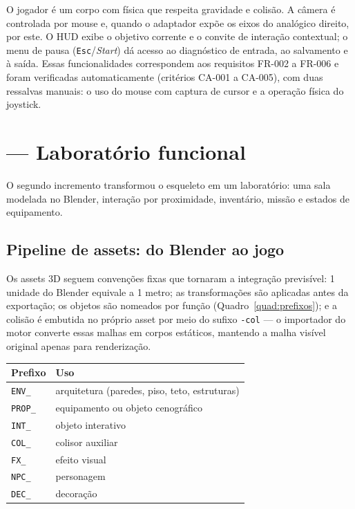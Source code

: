 O jogador é um corpo com física que respeita gravidade e colisão. A câmera é
controlada por mouse e, quando o adaptador expõe os eixos do analógico
direito, por este. O HUD exibe o objetivo corrente e o convite de interação
contextual; o menu de pausa (\texttt{Esc}/\emph{Start}) dá acesso ao
diagnóstico de entrada, ao salvamento e à saída. Essas funcionalidades
correspondem aos requisitos FR-002 a FR-006 e foram verificadas
automaticamente (critérios CA-001 a CA-005), com duas ressalvas manuais: o
uso do mouse com captura de cursor e a operação física do joystick.

\section{ --- Laboratório funcional}
\label{sec:poc2}

O segundo incremento transformou o esqueleto em um laboratório: uma sala
modelada no Blender, interação por proximidade, inventário, missão e estados
de equipamento.

\subsection{Pipeline de assets: do Blender ao jogo}
\label{sec:pipeline_assets}

Os assets 3D seguem convenções fixas que tornaram a integração previsível:
1 unidade do Blender equivale a 1 metro; as transformações são aplicadas antes
da exportação; os objetos são nomeados por função (Quadro~\ref{quad:prefixos});
e a colisão é embutida no próprio asset por meio do sufixo \texttt{-col} ---
o importador do motor converte essas malhas em corpos estáticos, mantendo a
malha visível original apenas para renderização.

\begin{quadro}[htbp]
\centering
\caption{Prefixos de nomenclatura adotados na modelagem.}
\label{quad:prefixos}
\footnotesize
\begin{tabular}{@{}>{\raggedright\arraybackslash}p{2.0cm} >{\raggedright\arraybackslash}p{11.0cm}@{}}
\toprule
Prefixo & Uso \\
\midrule
\texttt{ENV\_} & arquitetura (paredes, piso, teto, estruturas) \\
\texttt{PROP\_} & equipamento ou objeto cenográfico \\
\texttt{INT\_} & objeto interativo \\
\texttt{COL\_} & colisor auxiliar \\
\texttt{FX\_} & efeito visual \\
\texttt{NPC\_} & personagem \\
\texttt{DEC\_} & decoração \\
\bottomrule
\end{tabular}
\par\vspace{2pt}{\footnotesize Fonte: elaborado pelo autor (2026), a partir das convenções do projeto.}
\end{quadro}

